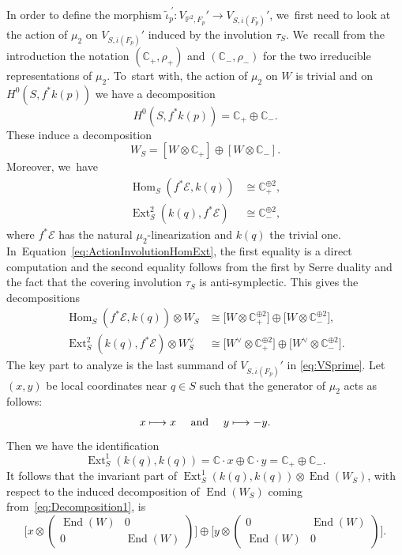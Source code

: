 \documentclass[JEP,XML,SOM,Unicode,published]{cedram}
\newcommand\mto{\mathchoice{\longmapsto}{\mapsto}{\mapsto}{\mapsto}}
\newcommand{\CC}{{\mathbb C}}\let\C\CC
\newcommand{\PP}{{\mathbb P}}\let\P\PP
\newcommand\cE{\mathcal{E}}
\DeclareMathOperator{\End}{End}
\DeclareMathOperator{\Ext}{Ext}
\DeclareMathOperator{\Hom}{Hom}
\theoremstyle{definition}
\begin{document}
In order to define the morphism $\widetilde{\iota}_p^{\ \prime}\colon V_{\PP^2,F_p}'\to V_{S,\overline{\iota}(F_p)}'$, we~first need to look at the action of $\mu_2$ on $V_{S,\overline{\iota}(F_p)}'$ induced by the involution $\tau_{S}$. We~recall from the introduction the notation $(\CC_{+},\rho_+)$ and $(\CC_{-},\rho_-)$ for the two irreducible representations of $\mu_2$. To~start with, the action of $\mu_2$ on $W$ is trivial and on $H^0(S,f^*k(p))$ we have a decomposition
\[
H^0(S,f^*k(p)) = \C_+ \oplus \C_-.
\]
These induce a decomposition
\begin{equation}\label{eq:Decomposition1}
W_S=\left[W\otimes \CC_{+}\right] \oplus[W\otimes \CC_{-}].
\end{equation}
Moreover, we~have
\begin{equation}\label{eq:ActionInvolutionHomExt}
\begin{split}
\Hom_{S}(f^*\cE,k(q)) &\cong \CC_{+}^{\oplus 2},\\
\Ext^2_{S}(k(q),f^*\cE) &\cong \CC_{-}^{\oplus 2},
\end{split}
\end{equation}
where $f^*\cE$ has the natural $\mu_2$-linearization and $k(q)$ the trivial one. In~Equation~\eqref{eq:ActionInvolutionHomExt}, the first equality is a direct computation and the second equality follows from the first by Serre duality and the fact that the covering involution $\tau_S$ is anti-symplectic.
This gives the decompositions
\begin{equation}\label{eq:ActionInvolutionHomExtW}
\begin{split}
\Hom_{S}(f^*\cE,k(q))\otimes W_S&\cong \bigl[W\otimes \CC_{+}^{\oplus 2}\bigr] \oplus \bigl[W\otimes \CC_{-}^{\oplus 2}\bigr],\\
\Ext^2_{S}(k(q),f^*\cE)\otimes W_S^\vee&\cong \bigl[W^\vee\otimes \CC_{+}^{\oplus 2}\bigr] \oplus \bigl[W^\vee\otimes \CC_{-}^{\oplus 2}\bigr].
\end{split}
\end{equation}
The key part to analyze is the last summand of $V_{S,\overline{\iota}(F_p)}'$ in \eqref{eq:VSprime}.
Let $(x,y)$ be local coordinates near $q\in S$ such that the generator of $\mu_2$ acts as follows:
\[
x\mto x\quad\text{ and }\quad y\mto -y.
\]
Then we have the identification
\begin{equation*}\label{eq:ExtDecomposition}
\Ext^1_{S}(k(q),k(q)) = \CC\cdot x \oplus \CC\cdot y = \CC_{+} \oplus \CC_{-}.
\end{equation*}
It follows that the invariant part of $\Ext^1_{S}(k(q),k(q))\otimes \End(W_S)$, with respect to the induced decomposition of $\End(W_S)$ coming from~\eqref{eq:Decomposition1}, is
\[
\biggl[x \otimes \begin{pmatrix}\End(W)&0\\0&\End(W)\end{pmatrix}\biggr] \oplus \biggl[y\otimes \begin{pmatrix}0&\End(W)\\\End(W)&0\end{pmatrix}\biggr].
\]
\end{document}
